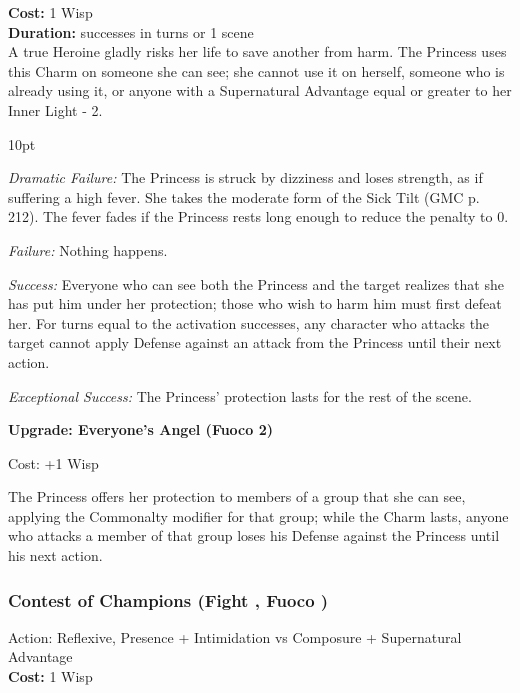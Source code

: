 \noindent \textbf{Cost:} 1 Wisp\\

\noindent \textbf{Duration:} successes in turns or 1 scene\\


A true Heroine gladly risks her life to save another from harm. The Princess uses this Charm on someone she can see; she cannot use it on herself, someone who is already using it, or anyone with a Supernatural Advantage equal or greater to her Inner Light - 2.

\begin{myindentpar}{10pt} 

\emph{Dramatic Failure:} The Princess is struck by dizziness and loses strength, as if suffering a high fever. She takes the moderate form of the Sick Tilt (GMC p. 212). The fever fades if the Princess rests long enough to reduce the penalty to 0.

\emph{Failure:} Nothing happens. 

\emph{Success:} Everyone who can see both the Princess and the target realizes that she has put him under her protection; those who wish to harm him must first defeat her. For turns equal to the activation successes, any character who attacks the target cannot apply Defense against an attack from the Princess until their next action.

\emph{Exceptional Success:} The Princess' protection lasts for the rest of the scene.

\textbf{Upgrade: Everyone's Angel (Fuoco 2)} 

Cost: +1 Wisp

The Princess offers her protection to members of a group that she can see, applying the Commonalty modifier for that group; while the Charm lasts, anyone who attacks a member of that group loses his Defense against the Princess until his next action.\end{myindentpar}


\subsubsection*{Contest of Champions (Fight \textbullet\textbullet, Fuoco \textbullet\textbullet)}

Action: Reflexive, Presence + Intimidation vs Composure + Supernatural Advantage\\

\noindent \textbf{Cost:} 1 Wisp\\

